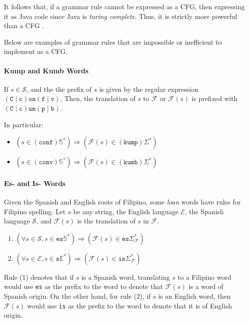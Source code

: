 It follows that, if a grammar rule cannot be expressed as a CFG, then expressing it as Java code since Java is \textit{turing complete}. Thus, it is strictly more powerful than a CFG \cite{church_turing}.

Below are examples of grammar rules that are impossible or inefficient to implement as a CFG.

\paragraph{Kump and Kumb Words} If \(s\in \mathcal{S}\), and the the prefix of \(s\) is given by the regular expression \((\texttt{C}\mid\texttt{c})\texttt{on}(\texttt{f}\mid\texttt{v})\). Then, the translation of $s$ to $\mathcal{F}$ or \(\mathcal{F}(s)\) is prefixed with \((\texttt{C}\mid\texttt{c})\texttt{um}(\texttt{p}\mid\texttt{b})\).

In particular:
\begin{itemize}
      \item \(\left(s \in (\texttt{conf})\mathbb{S}^*\right) \Longrightarrow \left(\mathcal{F}(s) \in (\texttt{kump})\Sigma^*\right)\)
      \item \(\left(s \in (\texttt{conv})\mathbb{S}^*\right) \Longrightarrow \left(\mathcal{F}(s) \in (\texttt{kumb})\Sigma^*\right)\)
\end{itemize}

\paragraph{Es- and Is- Words} Given the Spanish and English roots of Filipino, some \textit{loan} words have rules for Filipino spelling. Let \(s\) be any string, the English language \(\mathcal{E}\), the Spanish language \(\mathcal{S}\), and \(\mathcal{F}(s)\) is the translation of \(s\) in \(\mathcal{F}\).

\begin{enumerate}
      \item \(\left(\forall s\in \mathcal{S},s \in \texttt{es}\mathbb{S}^*\right) \Longrightarrow \left(\mathcal{F}(s) \in \texttt{es}\Sigma_\mathcal{F}^*\right) \)
      \item \(\left(\forall s\in \mathcal{E},s \in \texttt{s}\mathbb{E}^*\right) \Longrightarrow  \left(\mathcal{F}(s) \in \texttt{is} \Sigma_\mathcal{F}^* \right)\)
\end{enumerate}

Rule (1) denotes that if \(s\) is a Spanish word, translating \(s\) to a Filipino word would use \texttt{es} as the prefix to the word to denote that \(\mathcal{F}(s)\) is a word of Spanish origin. On the other hand, for rule (2), if \(s\) is an English word, then \(\mathcal{F}(s)\) would use \texttt{is} as the prefix to the word to denote that it is of English origin.

